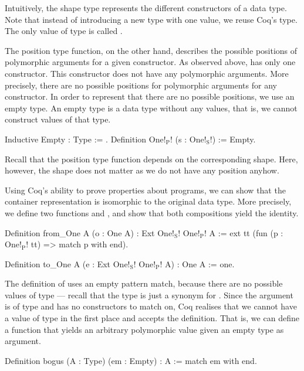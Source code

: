 Intuitively, the shape type represents the different constructors of a data type.
Note that instead of introducing a new type with one value, we reuse Coq's  type.
The only value of type  is called .

The position type function, on the other hand, describes the possible positions of polymorphic arguments for a given constructor.
As observed above,  has only one constructor.
This constructor  does not have any polymorphic arguments.
More precisely, there are no possible positions for polymorphic arguments for any constructor.
In order to represent that there are no possible positions, we use an empty type.
An empty type is a data type without any values, that is, we cannot construct values of that type.

\begin{coqcode}
Inductive Empty : Type := .
Definition One!$_\text{P}$! (s : One!$_\text{S}$!) := Empty.
\end{coqcode}
\label{code:one_container}

Recall that the position type function depends on the corresponding shape.
Here, however, the shape does not matter as we do not have any position anyhow.

Using Coq's ability to prove properties about programs, we can show that the container representation is isomorphic to the original data type.
More precisely, we define two functions  and , and show that both compositions yield the identity.

\begin{coqcode}
Definition from_One A (o : One A) : Ext One!$_\text{S}$! One!$_\text{P}$! A :=
  ext tt (fun (p : One!$_\text{P}$! tt) => match p with end).

Definition to_One A (e : Ext One!$_\text{S}$! One!$_\text{P}$! A) : One A :=
  one.
\end{coqcode}

The definition of  uses an empty pattern match, because there are no possible values of type  --- recall that the type is just a synonym for .
Since the argument  is of type  and  has no constructors to match on, Coq realises that we cannot have a value of type  in the first place and accepts the definition.
That is, we can define a function that yields an arbitrary polymorphic value given an empty type as argument.

\begin{coqcode}
Definition bogus (A : Type) (em : Empty) : A :=
  match em with end.
\end{coqcode}

